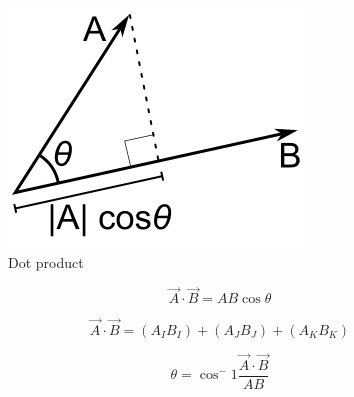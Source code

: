 \documentclass{article}
\begin{document}
\begin{multicols}{3}
	\begin{figure}[H]
		\centering
		\includegraphics[width=0.6\linewidth]{img/dot_product}
		\caption{Dot product}
		\label{fig:dot_product}
	\end{figure}

	\columnbreak
	\begin{equation*}
	\boxed{\vec{A}\cdot\vec{B} = AB\cos\theta}
	\end{equation*}

	\begin{equation*}
	\boxed{\vec{A}\cdot\vec{B} = (A_IB_I) + (A_JB_J) + (A_KB_K)}
	\end{equation*}

	\vfill\null
	\columnbreak

	\begin{equation*}
	\boxed{\theta = \cos^-1 \dfrac{\vec{A}\cdot\vec{B}}{AB}}
	\end{equation*}
\end{multicols}
\end{document}
